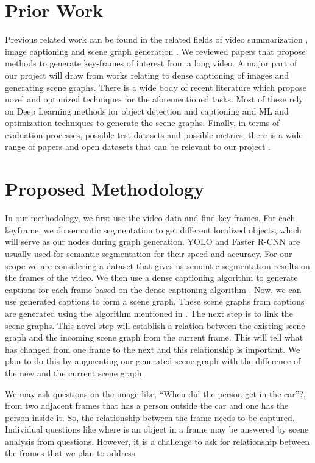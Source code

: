 \documentclass[sigconf]{acmart}
\begin{document}
\section{Prior Work}
\label{sec-3}

Previous related work can be found in the related fields of video
summarization \cite{DBLP:journals/corr/ZhangCSG16a}, image captioning
\cite{k2,d1} and scene graph generation \cite{k1,s2}. We reviewed papers
that propose methods to generate key-frames of interest from a long
video. A major part of our project will draw from works relating to
dense captioning of images and generating scene graphs. There is a
wide body of recent literature which propose novel and optimized
techniques for the aforementioned tasks. Most of these rely on Deep
Learning methods for object detection and captioning and ML and
optimization techniques to generate the scene graphs. Finally, in
terms of evaluation processes, possible test datasets and possible
metrics, there is a wide range of papers and open datasets that can
be relevant to our project \cite{DBLP:conf/cvpr/NohSH16}.



\section{Proposed Methodology}
\label{sec-4}

In our methodology, we first use the video data and find key frames.
For each keyframe, we do semantic segmentation to get different
localized objects, which will serve as our nodes during graph
generation. YOLO and Faster R-CNN are usually used for semantic
segmentation for their speed and accuracy. For our scope we are
considering a dataset that gives us semantic segmentation results on
the frames of the video.  We then use a dense captioning algorithm
to generate captions for each frame based on the dense captioning
algorithm \cite{k2}.  Now, we can use generated captions to form a
scene graph. These scene graphs from captions are generated using
the algorithm mentioned in \cite{s2}. The next step is to link the
scene graphs. This novel step will establish a relation between the
existing scene graph and the incoming scene graph from the current
frame. This will tell what has changed from one frame to the next
and this relationship is important.  We plan to do this by
augmenting our generated scene graph with the difference of the new
and the current scene graph.  

We may ask questions on the image like, “When did the person get in
the car”?, from two adjacent frames that has a person outside the
car and one has the person inside it.  So, the relationship between
the frame needs to be captured.  Individual questions like where is
an object in a frame may be answered by scene analysis from
questions.  However, it is a challenge to ask for relationship
between the frames that we plan to address.
\end{document}
